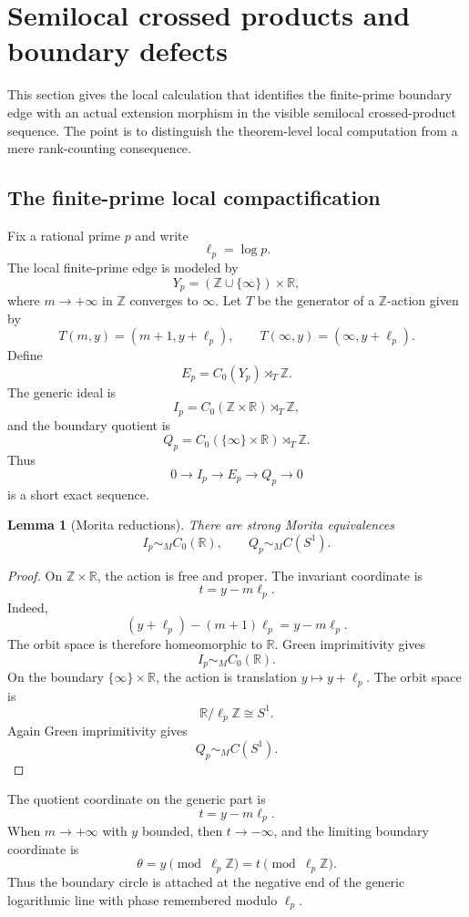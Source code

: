 \documentclass[11pt]{amsart}
\newtheorem{lemma}[theorem]{Lemma}
\newcommand{\ZZ}{\mathbb Z}
\newcommand{\RR}{\mathbb R}
\begin{document}
\section{Semilocal crossed products and boundary defects}

This section gives the local calculation that identifies the finite-prime boundary edge with an actual extension morphism in the visible semilocal crossed-product sequence.  The point is to distinguish the theorem-level local computation from a mere rank-counting consequence.

\subsection{The finite-prime local compactification}

Fix a rational prime $p$ and write
\[
        \ell_p=\log p.
\]
The local finite-prime edge is modeled by
\[
        Y_p=(\ZZ\cup\{\infty\})\times\RR,
\]
where $m\to+\infty$ in $\ZZ$ converges to $\infty$.  Let $T$ be the generator of a $\ZZ$-action given by
\[
        T(m,y)=(m+1,y+\ell_p),
        \qquad
        T(\infty,y)=(\infty,y+\ell_p).
\]
Define
\[
        E_p=C_0(Y_p)\rtimes_T\ZZ.
\]
The generic ideal is
\[
        I_p=C_0(\ZZ\times\RR)\rtimes_T\ZZ,
\]
and the boundary quotient is
\[
        Q_p=C_0(\{\infty\}\times\RR)\rtimes_T\ZZ.
\]
Thus
\[
        0\to I_p\to E_p\to Q_p\to0
\]
is a short exact sequence.

\begin{lemma}[Morita reductions]
There are strong Morita equivalences
\[
        I_p\sim_M C_0(\RR),
        \qquad
        Q_p\sim_M C(S^1).
\]
\end{lemma}

\begin{proof}
On $\ZZ\times\RR$, the action is free and proper.  The invariant coordinate is
\[
        t=y-m\ell_p.
\]
Indeed,
\[
        (y+\ell_p)-(m+1)\ell_p=y-m\ell_p.
\]
The orbit space is therefore homeomorphic to $\RR$.  Green imprimitivity gives
\[
        I_p\sim_M C_0(\RR).
\]
On the boundary $\{\infty\}\times\RR$, the action is translation $y\mapsto y+\ell_p$.  The orbit space is
\[
        \RR/\ell_p\ZZ\cong S^1.
\]
Again Green imprimitivity gives
\[
        Q_p\sim_M C(S^1).
\]
\end{proof}

The quotient coordinate on the generic part is
\[
        t=y-m\ell_p.
\]
When $m\to+\infty$ with $y$ bounded, then $t\to-\infty$, and the limiting boundary coordinate is
\[
        \theta=y\pmod{\ell_p\ZZ}=t\pmod{\ell_p\ZZ}.
\]
Thus the boundary circle is attached at the negative end of the generic logarithmic line with phase remembered modulo $\ell_p$.
\end{document}
